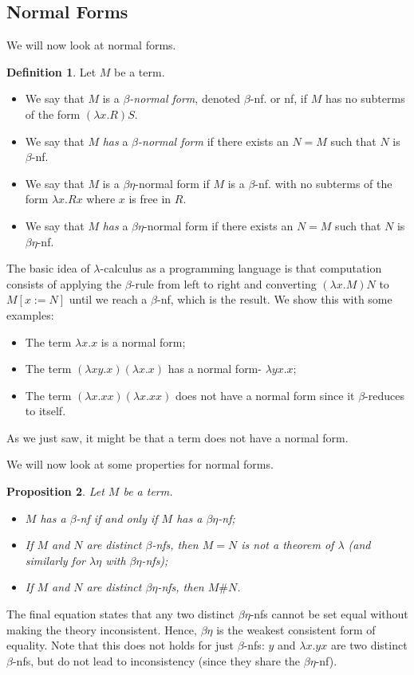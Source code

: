 \documentclass[a4paper, openany]{memoir}
\newtheorem{proposition}{Proposition}[section]
\theoremstyle{definition}
\newtheorem{definition}[proposition]{Definition}
\begin{document}
    \subsection{Normal Forms}
    We will now look at normal forms.
    \begin{definition}
        Let $M$ be a term.
        \begin{itemize}
            \item We say that $M$ is a \emph{$\beta$-normal form}, denoted $\beta$-nf. or nf, if $M$ has no subterms of the form $(\lambda x.R)S$.
            \item We say that $M$ \emph{has} a \emph{$\beta$-normal form} if there exists an $N = M$ such that $N$ is $\beta$-nf.
            \item We say that $M$ is a $\beta \eta$-normal form if $M$ is a $\beta$-nf. with no subterms of the form $\lambda x.Rx$ where $x$ is free in $R$.
            \item We say that $M$ \emph{has} a $\beta \eta$-normal form if there exists an $N = M$ such that $N$ is $\beta \eta$-nf.
        \end{itemize}
    \end{definition}
    The basic idea of $\lambda$-calculus as a programming language is that computation consists of applying the $\beta$-rule from left to right and converting $(\lambda x.M)N$ to $M[x := N]$ until we reach a $\beta$-nf, which is the result. We show this with some examples:
    \begin{itemize}
        \item The term $\lambda x.x$ is a normal form;
        \item The term $(\lambda xy.x)(\lambda x.x)$ has a normal form- $\lambda yx.x$;
        \item The term $(\lambda x.xx)(\lambda x.xx)$ does not have a normal form since it $\beta$-reduces to itself.
    \end{itemize}
    As we just saw, it might be that a term does not have a normal form.

    We will now look at some properties for normal forms.
    \begin{proposition}
        Let $M$ be a term.
        \begin{itemize}
            \item $M$ has a $\beta$-nf if and only if $M$ has a $\beta \eta$-nf;
            \item If $M$ and $N$ are distinct $\beta$-nfs, then $M = N$ is not a theorem of $\lambda$ (and similarly for $\lambda \eta$ with $\beta \eta$-nfs);
            \item If $M$ and $N$ are distinct $\beta \eta$-nfs, then $M \# N$.
        \end{itemize}
    \end{proposition}
    \noindent The final equation states that any two distinct $\beta \eta$-nfs cannot be set equal without making the theory inconsistent. Hence, $\beta \eta$ is the weakest consistent form of equality. Note that this does not holds for just $\beta$-nfs: $y$ and $\lambda x.yx$ are two distinct $\beta$-nfs, but do not lead to inconsistency (since they share the $\beta \eta$-nf). 
    
\end{document}
